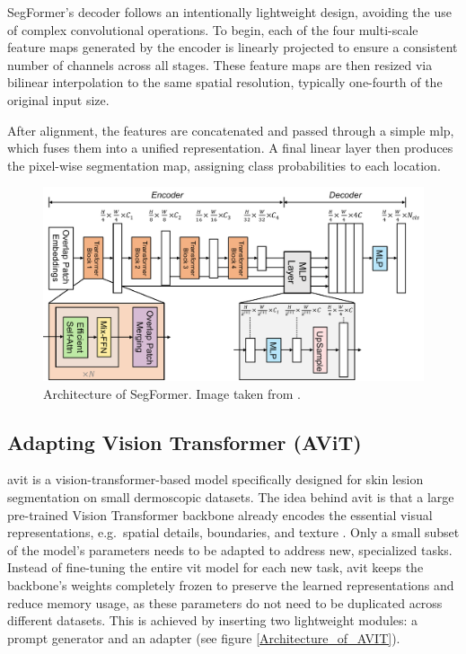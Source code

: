 \medskip

SegFormer's decoder follows an intentionally lightweight design, avoiding the use of complex convolutional operations. To begin, each of the four multi-scale feature maps generated by the encoder is linearly projected to ensure a consistent number of channels across all stages. These feature maps are then resized via bilinear interpolation to the same spatial resolution, typically one-fourth of the original input size.

\medskip

After alignment, the features are concatenated and passed through a simple \gls{mlp}, which fuses them into a unified representation. A final linear layer then produces the pixel-wise segmentation map, assigning class probabilities to each location.

\begin{figure}[H]
	\centering
	\includegraphics[width=1.0\textwidth]{./images/Segformer_architecture.pdf}
	\caption[Architecture of SegFormer]{Architecture of SegFormer. Image taken from \cite{xie2021segformersimpleefficientdesign}.}
	\label{Architecture_of_Segformer}
\end{figure}



\subsection{Adapting Vision Transformer (AViT)}
\gls{avit} is a vision-transformer-based model specifically designed for skin lesion segmentation on small dermoscopic datasets. The idea behind \gls{avit} is that a large pre-trained Vision Transformer backbone already encodes the essential visual representations, e.g.~spatial details, boundaries, and texture \cite{du2024avitadaptingvisiontransformers}. Only a small subset of the model's parameters needs to be adapted to address new, specialized tasks. Instead of fine-tuning the entire \gls{vit} model for each new task, \gls{avit} keeps the backbone's weights completely frozen to preserve the learned representations and reduce memory usage, as these parameters do not need to be duplicated across different datasets. This is achieved by inserting two lightweight modules: a prompt generator and an adapter (see figure \ref{Architecture_of_AVIT}).

